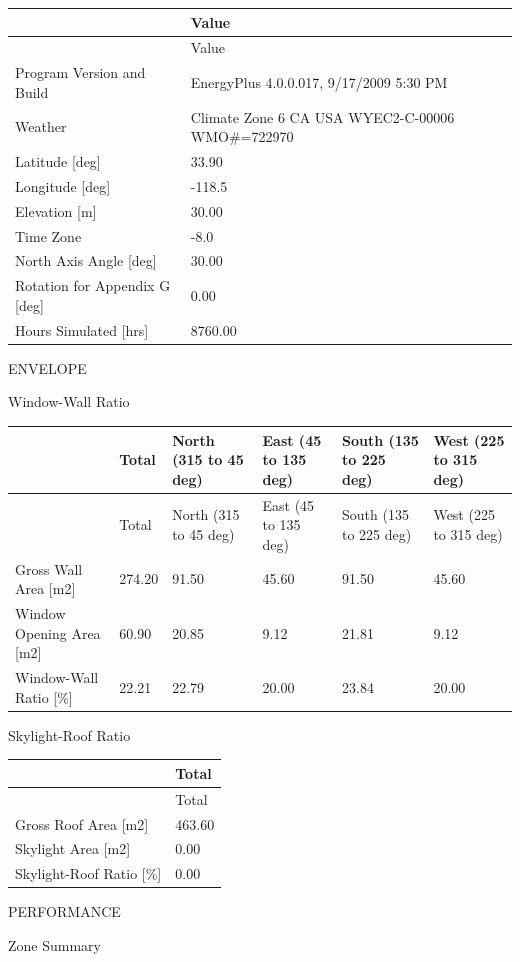 \begin{longtable}[c]{>{\raggedright}p{2.25in}>{\raggedright}p{3.74in}}
\toprule
~ & Value \tabularnewline
\midrule
\endfirsthead

\toprule
~ & Value \tabularnewline
\midrule
\endhead

Program Version and Build & EnergyPlus 4.0.0.017, 9/17/2009 5:30 PM \tabularnewline
Weather & Climate Zone 6 CA USA WYEC2-C-00006 WMO\#=722970 \tabularnewline
Latitude [deg] & 33.90 \tabularnewline
Longitude [deg] & -118.5 \tabularnewline
Elevation [m] & 30.00 \tabularnewline
Time Zone & -8.0 \tabularnewline
North Axis Angle [deg] & 30.00 \tabularnewline
Rotation for Appendix G [deg] & 0.00 \tabularnewline
Hours Simulated [hrs] & 8760.00 \tabularnewline
\bottomrule
\end{longtable}

ENVELOPE

Window-Wall Ratio

\begin{longtable}[c]{>{\raggedright}p{1.0in}>{\raggedright}p{1.0in}>{\raggedright}p{1.0in}>{\raggedright}p{1.0in}>{\raggedright}p{1.0in}>{\raggedright}p{1.0in}}
\toprule
~ & Total & North (315 to 45 deg) & East (45 to 135 deg) & South (135 to 225 deg) & West (225 to 315 deg) \tabularnewline
\midrule
\endfirsthead

\toprule
~ & Total & North (315 to 45 deg) & East (45 to 135 deg) & South (135 to 225 deg) & West (225 to 315 deg) \tabularnewline
\midrule
\endhead

Gross Wall Area [m2] & 274.20 & 91.50 & 45.60 & 91.50 & 45.60 \tabularnewline
Window Opening Area [m2] & 60.90 & 20.85 & 9.12 & 21.81 & 9.12 \tabularnewline
Window-Wall Ratio [\%] & 22.21 & 22.79 & 20.00 & 23.84 & 20.00 \tabularnewline
\bottomrule
\end{longtable}

Skylight-Roof Ratio

\begin{longtable}[c]{@{}ll@{}}
\toprule
~ & Total \tabularnewline
\midrule
\endfirsthead

\toprule
~ & Total \tabularnewline
\midrule
\endhead

Gross Roof Area [m2] & 463.60 \tabularnewline
Skylight Area [m2] & 0.00 \tabularnewline
Skylight-Roof Ratio [\%] & 0.00 \tabularnewline
\bottomrule
\end{longtable}

PERFORMANCE

Zone Summary

